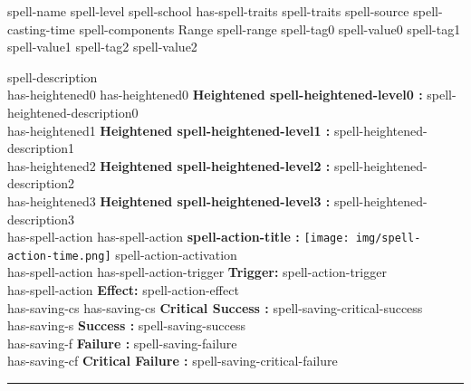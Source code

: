 \documentclass{article}
\begin{document}
\begin{spell}
{spell-name} %
{spell-level} %
{spell-school has-spell-traits spell-traits} %
{spell-source} %
{spell-casting-time} %
{spell-components} %
{Range} {spell-range}
{spell-tag0} {spell-value0}
{spell-tag1} {spell-value1}
{spell-tag2} {spell-value2}
    \begingroup
        \singlespacing
        \begin{singlespace*}
        \par\fontsize{spell-font-size}{10pt}\selectfont
        \vspace{7mm}   %
        spell-description\\
        
        has-heightened0 \vspace{2mm}
        has-heightened0 \textbf{Heightened spell-heightened-level0 :} spell-heightened-description0\\
        has-heightened1 \textbf{Heightened spell-heightened-level1 :} spell-heightened-description1\\
        has-heightened2 \textbf{Heightened spell-heightened-level2 :} spell-heightened-description2\\
        has-heightened3 \textbf{Heightened spell-heightened-level3 :} spell-heightened-description3\\

        has-spell-action \vspace{2mm}
        has-spell-action \textbf{spell-action-title :} \texttt{[image: img/spell-action-time.png]} spell-action-activation\\
        has-spell-action has-spell-action-trigger \textbf{Trigger:} spell-action-trigger\\
        has-spell-action \textbf{Effect:} spell-action-effect\\

        has-saving-cs \vspace{2mm}
        has-saving-cs \textbf{Critical Success :} spell-saving-critical-success\\
        has-saving-s \textbf{Success :} spell-saving-success\\
        has-saving-f \textbf{Failure :} spell-saving-failure\\
        has-saving-cf \textbf{Critical Failure :} spell-saving-critical-failure\\
        \rule{\textwidth}{0.5pt}
        \end{singlespace*}
    \endgroup
\end{spell}
\end{document}
